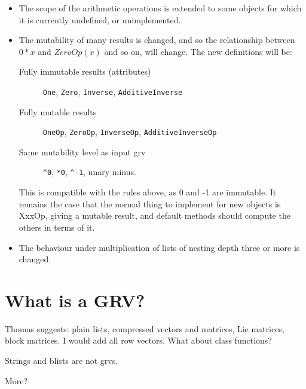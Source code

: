 \documentclass{article}
\begin{document}
\begin{itemize}
\item The scope of the arithmetic operations is extended to some objects for 
which it is currently undefined, or unimplemented.

\item The mutability of many results is changed, and so the relationship
between $0*x$ and $ZeroOp(x)$ and so on, will change. The new
definitions will be:
\begin{description} 
\item[Fully immutable results (attributes)] \verb|One|, \verb|Zero|,
\verb|Inverse|, \verb|AdditiveInverse|
\item[Fully mutable results] \verb|OneOp|, \verb|ZeroOp|,
\verb|InverseOp|, \verb|AdditiveInverseOp|
\item[Same mutability level as input grv] \verb|^0|, \verb|*0|,
\verb|^-1|, unary minus.
\end{description}

This is compatible with the rules above, as 0 and -1 are immutable. It 
remains the case that the normal thing to implement for new objects is 
XxxOp, giving a mutable result, and default methods should compute the 
others in terms of it.

\item The behaviour under multiplication of lists of nesting depth three or
more is changed. 
\end{itemize}

\section{What is a GRV?}

Thomas suggests: plain lists, compressed vectors and matrices, Lie
matrices, block matrices. I would add all row vectors. What about
class functions? 

Strings and blists are not grvs.

More?
\end{document}
